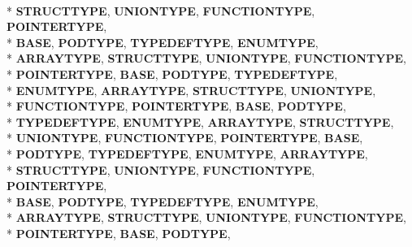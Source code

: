 \begin{DoxyCompactItemize}
\\*
{\bfseries S\-T\-R\-U\-C\-T\-T\-Y\-P\-E}, 
{\bfseries U\-N\-I\-O\-N\-T\-Y\-P\-E}, 
{\bfseries F\-U\-N\-C\-T\-I\-O\-N\-T\-Y\-P\-E}, 
{\bfseries P\-O\-I\-N\-T\-E\-R\-T\-Y\-P\-E}, 
\\*
{\bfseries B\-A\-S\-E}, 
{\bfseries P\-O\-D\-T\-Y\-P\-E}, 
{\bfseries T\-Y\-P\-E\-D\-E\-F\-T\-Y\-P\-E}, 
{\bfseries E\-N\-U\-M\-T\-Y\-P\-E}, 
\\*
{\bfseries A\-R\-R\-A\-Y\-T\-Y\-P\-E}, 
{\bfseries S\-T\-R\-U\-C\-T\-T\-Y\-P\-E}, 
{\bfseries U\-N\-I\-O\-N\-T\-Y\-P\-E}, 
{\bfseries F\-U\-N\-C\-T\-I\-O\-N\-T\-Y\-P\-E}, 
\\*
{\bfseries P\-O\-I\-N\-T\-E\-R\-T\-Y\-P\-E}, 
{\bfseries B\-A\-S\-E}, 
{\bfseries P\-O\-D\-T\-Y\-P\-E}, 
{\bfseries T\-Y\-P\-E\-D\-E\-F\-T\-Y\-P\-E}, 
\\*
{\bfseries E\-N\-U\-M\-T\-Y\-P\-E}, 
{\bfseries A\-R\-R\-A\-Y\-T\-Y\-P\-E}, 
{\bfseries S\-T\-R\-U\-C\-T\-T\-Y\-P\-E}, 
{\bfseries U\-N\-I\-O\-N\-T\-Y\-P\-E}, 
\\*
{\bfseries F\-U\-N\-C\-T\-I\-O\-N\-T\-Y\-P\-E}, 
{\bfseries P\-O\-I\-N\-T\-E\-R\-T\-Y\-P\-E}, 
{\bfseries B\-A\-S\-E}, 
{\bfseries P\-O\-D\-T\-Y\-P\-E}, 
\\*
{\bfseries T\-Y\-P\-E\-D\-E\-F\-T\-Y\-P\-E}, 
{\bfseries E\-N\-U\-M\-T\-Y\-P\-E}, 
{\bfseries A\-R\-R\-A\-Y\-T\-Y\-P\-E}, 
{\bfseries S\-T\-R\-U\-C\-T\-T\-Y\-P\-E}, 
\\*
{\bfseries U\-N\-I\-O\-N\-T\-Y\-P\-E}, 
{\bfseries F\-U\-N\-C\-T\-I\-O\-N\-T\-Y\-P\-E}, 
{\bfseries P\-O\-I\-N\-T\-E\-R\-T\-Y\-P\-E}, 
{\bfseries B\-A\-S\-E}, 
\\*
{\bfseries P\-O\-D\-T\-Y\-P\-E}, 
{\bfseries T\-Y\-P\-E\-D\-E\-F\-T\-Y\-P\-E}, 
{\bfseries E\-N\-U\-M\-T\-Y\-P\-E}, 
{\bfseries A\-R\-R\-A\-Y\-T\-Y\-P\-E}, 
\\*
{\bfseries S\-T\-R\-U\-C\-T\-T\-Y\-P\-E}, 
{\bfseries U\-N\-I\-O\-N\-T\-Y\-P\-E}, 
{\bfseries F\-U\-N\-C\-T\-I\-O\-N\-T\-Y\-P\-E}, 
{\bfseries P\-O\-I\-N\-T\-E\-R\-T\-Y\-P\-E}, 
\\*
{\bfseries B\-A\-S\-E}, 
{\bfseries P\-O\-D\-T\-Y\-P\-E}, 
{\bfseries T\-Y\-P\-E\-D\-E\-F\-T\-Y\-P\-E}, 
{\bfseries E\-N\-U\-M\-T\-Y\-P\-E}, 
\\*
{\bfseries A\-R\-R\-A\-Y\-T\-Y\-P\-E}, 
{\bfseries S\-T\-R\-U\-C\-T\-T\-Y\-P\-E}, 
{\bfseries U\-N\-I\-O\-N\-T\-Y\-P\-E}, 
{\bfseries F\-U\-N\-C\-T\-I\-O\-N\-T\-Y\-P\-E}, 
\\*
{\bfseries P\-O\-I\-N\-T\-E\-R\-T\-Y\-P\-E}, 
{\bfseries B\-A\-S\-E}, 
{\bfseries P\-O\-D\-T\-Y\-P\-E}, 

\end{DoxyCompactItemize}
